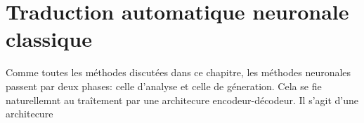 \section{Traduction automatique neuronale classique}
\label{sec:nmt-classic}

Comme toutes les méthodes discutées dans ce chapitre, les méthodes neuronales passent par deux phases:
celle d'analyse et celle de géneration. 
Cela se fie naturellemnt au traîtement par une architecure encodeur-décodeur.
Il s'agit d'une architecure